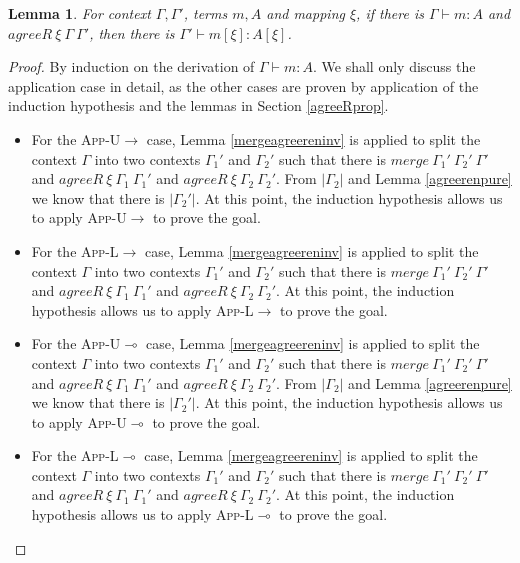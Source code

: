 \documentclass{article}
\newtheorem{lemma}[theorem]{Lemma}
\theoremstyle{definition}
\newcommand{\rname}[1]{\textsc{\footnotesize #1}}
\newcommand{\pure}[1]{|#1|}
\newcommand{\mrg}[3]{merge\ {#1}\ {#2}\ {#3}}
\begin{document}
\begin{lemma}\label{renaming}
  For context $\Gamma, \Gamma'$, terms $m, A$ and mapping $\xi$, if there is $\Gamma \vdash m : A$ and $agreeR\ \xi\ \Gamma\ \Gamma'$, then there is $\Gamma' \vdash m[\xi] : A[\xi]$.
\end{lemma}
\begin{proof}
  By induction on the derivation of $\Gamma \vdash m : A$. We shall only discuss the application case in detail, as the other cases are proven by application of the induction hypothesis and the lemmas in Section \ref{agreeRprop}.
  \begin{itemize}
    \item For the \rname{App-U$\rightarrow$} case, Lemma \ref{mergeagreereninv} is applied to split the context $\Gamma$ into two contexts $\Gamma_1'$ and $\Gamma_2'$ such that there is $\mrg{\Gamma_1'}{\Gamma_2'}{\Gamma'}$ and $agreeR\ \xi\ \Gamma_1\ \Gamma_1'$ and $agreeR\ \xi\ \Gamma_2\ \Gamma_2'$. From $\pure{\Gamma_2}$ and Lemma \ref{agreerenpure} we know that there is $\pure{\Gamma_2'}$. At this point, the induction hypothesis allows us to apply \rname{App-U$\rightarrow$} to prove the goal.
    \item For the \rname{App-L$\rightarrow$} case, Lemma \ref{mergeagreereninv} is applied to split the context $\Gamma$ into two contexts $\Gamma_1'$ and $\Gamma_2'$ such that there is $\mrg{\Gamma_1'}{\Gamma_2'}{\Gamma'}$ and $agreeR\ \xi\ \Gamma_1\ \Gamma_1'$ and $agreeR\ \xi\ \Gamma_2\ \Gamma_2'$. At this point, the induction hypothesis allows us to apply \rname{App-L$\rightarrow$} to prove the goal.
    \item For the \rname{App-U$\multimap$} case, Lemma \ref{mergeagreereninv} is applied to split the context $\Gamma$ into two contexts $\Gamma_1'$ and $\Gamma_2'$ such that there is $\mrg{\Gamma_1'}{\Gamma_2'}{\Gamma'}$ and $agreeR\ \xi\ \Gamma_1\ \Gamma_1'$ and $agreeR\ \xi\ \Gamma_2\ \Gamma_2'$. From $\pure{\Gamma_2}$ and Lemma \ref{agreerenpure} we know that there is $\pure{\Gamma_2'}$. At this point, the induction hypothesis allows us to apply \rname{App-U$\multimap$} to prove the goal.
    \item For the \rname{App-L$\multimap$} case, Lemma \ref{mergeagreereninv} is applied to split the context $\Gamma$ into two contexts $\Gamma_1'$ and $\Gamma_2'$ such that there is $\mrg{\Gamma_1'}{\Gamma_2'}{\Gamma'}$ and $agreeR\ \xi\ \Gamma_1\ \Gamma_1'$ and $agreeR\ \xi\ \Gamma_2\ \Gamma_2'$. At this point, the induction hypothesis allows us to apply \rname{App-L$\multimap$} to prove the goal.
  \end{itemize}
\end{proof}
\end{document}
